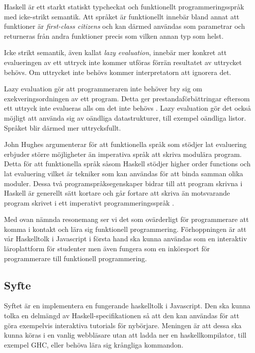Haskell är ett starkt statiskt typcheckat och funktionellt programmeringsspråk med icke-strikt semantik. %
Att språket är funktionellt innebär bland annat att funktioner är \emph{first-class citizens} och kan därmed användas som parametrar och returneras från andra funktioner precis som vilken annan typ som helst.

Icke strikt semantik, även kallat \emph{lazy evaluation}, innebär mer konkret att evalueringen av ett uttryck inte kommer utföras förrän resultatet av uttrycket behövs. Om uttrycket inte behövs  kommer interpretatorn att ignorera det. %

Lazy evaluation gör att programmeraren inte behöver bry sig om exekveringsordningen av ett program. Detta ger prestandaförbättringar eftersom ett uttryck inte evalueras alls om det inte behövs \citep{hudak89}.
Lazy evaluation gör det också möjligt att använda sig av oändliga datastrukturer, till exempel oändliga listor. Språket blir därmed mer uttrycksfullt. 

John Hughes argumenterar för att  funktionella språk som stödjer lat evaluering erbjuder större möjligheter än imperativa språk att skriva modulära program. Detta för att funktionella språk såsom Haskell stödjer higher order functions och lat evaluering vilket är tekniker som kan användas för att binda samman olika moduler.
Dessa två programspråksegenskaper bidrar till att program skrivna i Haskell är generellt sätt kortare och går fortare att skriva än motsvarande program skrivet i ett imperativt programmeringsspråk  \citep{why}.

Med ovan nämnda resonemang ser vi det som ovärderligt för programmerare att komma i kontakt och lära sig funktionell programmering. 
Förhoppningen är att vår Haskelltolk i Javascript i första hand ska kunna användas som en interaktiv läroplattform för studenter men även fungera som en inkörsport för programmerare till funktionell programmering. 


\subsection{Syfte}
Syftet är en implementera en fungerande haskelltolk i Javascript. Den ska kunna tolka en delmängd av Haskell-specifikationen så att den kan användas för att göra exempelvis interaktiva tutorials för nybörjare.
Meningen är att dessa ska kunna köras i en vanlig webbläsare utan att ladda ner en haskellkompilator, till exempel GHC, eller behöva lära sig krångliga kommandon.

